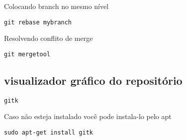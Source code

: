 \documentclass[a4paper]{article}
\begin{document}
Colocando branch no mesmo nível
\begin{lstlisting}
git rebase mybranch
\end{lstlisting}

Resolvendo conflito de merge
\begin{lstlisting}
git mergetool
\end{lstlisting}

\subsection*{visualizador gráfico do repositório}

\begin{lstlisting}
gitk
\end{lstlisting}

Caso não esteja instalado você pode instala-lo pelo apt
\begin{lstlisting}
sudo apt-get install gitk
\end{lstlisting}
\end{document}
